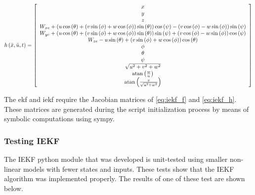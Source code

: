 \begin{equation}
    h\left(\bar x, \bar u, t \right ) =
    \left[ {\begin{array}{*{20}{c}}
        x\\
        y\\
        z\\
        {{W_{xe}} + \left( {u\cos \left( \theta  \right) + \left( {v\sin \left( \phi  \right) + w\cos \left( \phi  \right)} \right)\sin \left( \theta  \right)} \right)\cos \left( \psi  \right) - \left( {v\cos \left( \phi  \right) - w\sin \left( \phi  \right)} \right)\sin \left( \psi  \right)}\\
        {{W_{ye}} + \left( {u\cos \left( \theta  \right) + \left( {v\sin \left( \phi  \right) + w\cos \left( \phi  \right)} \right)\sin \left( \theta  \right)} \right)\sin \left( \psi  \right) + \left( {v\cos \left( \phi  \right) - w\sin \left( \phi  \right)} \right)\cos \left( \psi  \right)}\\
        {{W_{ze}} - u\sin \left( \theta  \right) + \left( {v\sin \left( \phi  \right) + w\cos \left( \phi  \right)} \right)\cos \left( \theta  \right)}\\
        \phi \\
        \theta \\
        \psi \\
        {\sqrt {{u^2} + {v^2} + {w^2}} }\\
        {{\mathop{\rm atan}\nolimits} \left( {\frac{w}{u}} \right)}\\
        {{\mathop{\rm atan}\nolimits} \left( {\frac{v}{{\sqrt {{u^2} + {w^2}} }}} \right)}
        \end{array}} \right]
        \label{eq:iekf_h}
\end{equation}

The \gls{ekf} and \gls{iekf} require the Jacobian matrices of \autoref{eq:iekf_f} and \autoref{eq:iekf_h}. These matrices are generated during the script initialization process by means of symbolic computations using sympy.


\subsubsection{Testing IEKF}
The IEKF python module that was developed is unit-tested using smaller non-linear models with fewer states and inputs. These tests show that the IEKF algorithm was implemented properly. The results of one of these test are shown below.\\

